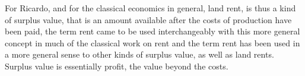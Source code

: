  


For Ricardo, and for the classical economics in general, land rent, is thus a kind of surplus value, that is an amount available after the costs of production have been paid, the term rent came to be used interchangeably with this more general concept in much of the classical work on rent and the term rent has been used in a more general sense to other kinds of surplus value, as well as land rents. Surplus value is essentially profit, the value beyond the costs. 

